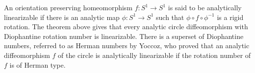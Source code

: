 \documentclass[12pt]{article}
\newtheorem{theorem}{Theorem}[section]
\begin{document}
%
%
%  
  An orientation preserving homeomorphism $f:S^1\to S^1$ is said to be analytically linearizable if there is an analytic map $\phi: S^1\to S^1$ such that $\phi \circ f \circ \phi^{-1}$ is a rigid rotation.  The theorem above gives that every analytic circle diffeomorphism with Diophantine rotation number is linearizable.
 There is a superset of Diophantine numbers, referred to as Herman numbers by  Yoccoz, who proved that an analytic diffeomorphism $f$ of the circle   is analytically linearizable if  the rotation number of \(f\) is of Herman type. 
% 
\end{document}
